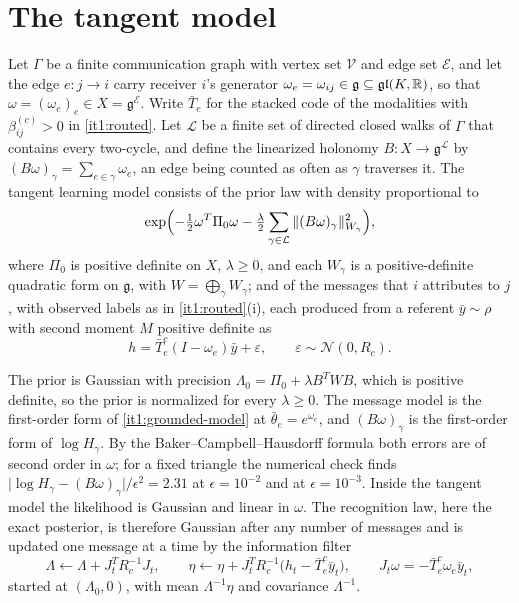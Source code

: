 \documentclass[11pt,letterpaper]{report}
\begin{document}
\section{The tangent model}

Let $\Gamma$ be a finite communication graph with vertex set $\mathcal V$ and edge set $\mathcal E$, and let the edge $e:j\to i$ carry receiver $i$'s generator $\omega_e=\omega_{ij}\in\mathfrak g\subseteq\mathfrak{gl}(K,\mathbb R)$, so that $\omega=(\omega_e)_e\in X=\mathfrak g^{\mathcal E}$. Write $\bar T_e$ for the stacked code of the modalities with $\beta^{(c)}_{ij}>0$ in \cref{it1:routed}. Let $\mathcal L$ be a finite set of directed closed walks of $\Gamma$ that contains every two-cycle, and define the linearized holonomy $B:X\to\mathfrak g^{\mathcal L}$ by $(B\omega)_\gamma=\sum_{e\in\gamma}\omega_e$, an edge being counted as often as $\gamma$ traverses it. The tangent learning model consists of the prior law with density proportional to
\begin{equation}
\exp\Bigl(-\tfrac12\omega^T\Pi_0\omega-\tfrac\lambda2\sum_{\gamma\in\mathcal L}\Vert(B\omega)_\gamma\Vert_{W_\gamma}^2\Bigr),
\label{it1:loop-prior}
\end{equation}
where $\Pi_0$ is positive definite on $X$, $\lambda\geq0$, and each $W_\gamma$ is a positive-definite quadratic form on $\mathfrak g$, with $W=\bigoplus_\gamma W_\gamma$; and of the messages that $i$ attributes to $j$, with observed labels as in \cref{it1:routed}(i), each produced from a referent $\bar y\sim\rho$ with second moment $M$ positive definite as
\begin{equation}
h=\bar T_e^c(I-\omega_e)\bar y+\varepsilon,\qquad\varepsilon\sim\mathcal N(0,R_c).
\label{it1:tangent-message}
\end{equation}

The prior is Gaussian with precision $\Lambda_0=\Pi_0+\lambda B^TWB$, which is positive definite, so the prior is normalized for every $\lambda\geq0$. The message model is the first-order form of \cref{it1:grounded-model} at $\bar\theta_e=e^{\omega_e}$, and $(B\omega)_\gamma$ is the first-order form of $\log H_\gamma$. By the Baker--Campbell--Hausdorff formula both errors are of second order in $\omega$; for a fixed triangle the numerical check finds $\vert\log H_\gamma-(B\omega)_\gamma\vert/\epsilon^2=2.31$ at $\epsilon=10^{-2}$ and at $\epsilon=10^{-3}$. Inside the tangent model the likelihood is Gaussian and linear in $\omega$. The recognition law, here the exact posterior, is therefore Gaussian after any number of messages and is updated one message at a time by the information filter
\begin{equation}
\Lambda\leftarrow\Lambda+J_t^TR_c^{-1}J_t,\qquad
\eta\leftarrow\eta+J_t^TR_c^{-1}\bigl(h_t-\bar T_e^c\bar y_t\bigr),\qquad
J_t\omega=-\bar T_e^c\omega_e\bar y_t,
\label{it1:information-filter}
\end{equation}
started at $(\Lambda_0,0)$, with mean $\Lambda^{-1}\eta$ and covariance $\Lambda^{-1}$.
\end{document}
